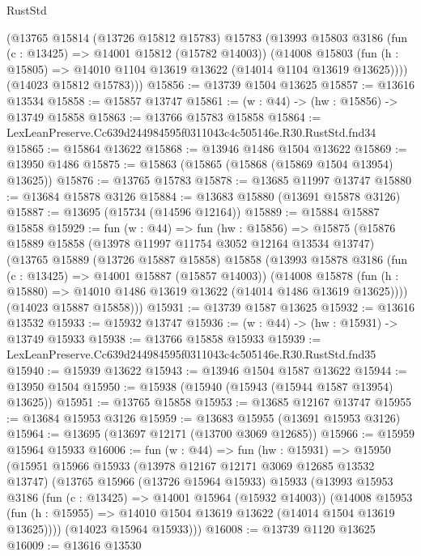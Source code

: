 \begin{lexlean}{RustStd}
\begin{coremodule}
      (@13765
        @15814
        (@13726 @15812 @15783)
        @15783
        (@13993
          @15803
          @3186
          (fun (c : @13425) => @14001 @15812 (@15782 @14003))
          (@14008
            @15803
            (fun (h : @15805) => @14010 @1104 @13619 @13622 (@14014 @1104 @13619 @13625))))
        (@14023 @15812 @15783)))
@15856 := @13739 @1504 @13625
@15857 := @13616 @13534
@15858 := @15857 @13747
@15861 := (w : @44) -> (hw : @15856) -> @13749 @15858
@15863 := @13766 @15783 @15858
@15864 := LexLeanPreserve.Cc639d244984595f0311043c4c505146e.R30.RustStd.fnd34
@15865 := @15864 @13622
@15868 := @13946 @1486 @1504 @13622
@15869 := @13950 @1486
@15875 := @15863 (@15865 (@15868 (@15869 @1504 @13954) @13625))
@15876 := @13765 @15783
@15878 := @13685 @11997 @13747
@15880 := @13684 @15878 @3126
@15884 := @13683 @15880 (@13691 @15878 @3126)
@15887 := @13695 (@15734 (@14596 @12164))
@15889 := @15884 @15887 @15858
@15929 := fun (w : @44) =>
  fun (hw : @15856) =>
  @15875
    (@15876
      @15889
      @15858
      (@13978 @11997 @11754 @3052 @12164 @13534 @13747)
      (@13765
        @15889
        (@13726 @15887 @15858)
        @15858
        (@13993
          @15878
          @3186
          (fun (c : @13425) => @14001 @15887 (@15857 @14003))
          (@14008
            @15878
            (fun (h : @15880) => @14010 @1486 @13619 @13622 (@14014 @1486 @13619 @13625))))
        (@14023 @15887 @15858)))
@15931 := @13739 @1587 @13625
@15932 := @13616 @13532
@15933 := @15932 @13747
@15936 := (w : @44) -> (hw : @15931) -> @13749 @15933
@15938 := @13766 @15858 @15933
@15939 := LexLeanPreserve.Cc639d244984595f0311043c4c505146e.R30.RustStd.fnd35
@15940 := @15939 @13622
@15943 := @13946 @1504 @1587 @13622
@15944 := @13950 @1504
@15950 := @15938 (@15940 (@15943 (@15944 @1587 @13954) @13625))
@15951 := @13765 @15858
@15953 := @13685 @12167 @13747
@15955 := @13684 @15953 @3126
@15959 := @13683 @15955 (@13691 @15953 @3126)
@15964 := @13695 (@13697 @12171 (@13700 @3069 @12685))
@15966 := @15959 @15964 @15933
@16006 := fun (w : @44) =>
  fun (hw : @15931) =>
  @15950
    (@15951
      @15966
      @15933
      (@13978 @12167 @12171 @3069 @12685 @13532 @13747)
      (@13765
        @15966
        (@13726 @15964 @15933)
        @15933
        (@13993
          @15953
          @3186
          (fun (c : @13425) => @14001 @15964 (@15932 @14003))
          (@14008
            @15953
            (fun (h : @15955) => @14010 @1504 @13619 @13622 (@14014 @1504 @13619 @13625))))
        (@14023 @15964 @15933)))
@16008 := @13739 @1120 @13625
@16009 := @13616 @13530

\end{coremodule}
\end{lexlean}
